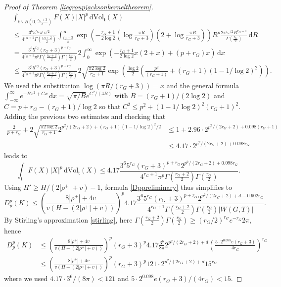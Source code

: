 \documentclass[11pt,a4paper]{article}
\theoremstyle{definition}
\begin{document}
\begin{proof}[Proof of Theorem \ref{liegroupjacksonkerneltheorem}]
\[ \begin{split} &\int_{\mathfrak{t} \backslash B \left( 0, \frac{r_G+3}{\pi} \right)} F(X) |X|^p \, \mathrm{d}\mathrm{Vol}_{\mathfrak{t}}(X) \\ &\le \frac{3^6 5^{r_G} \pi^{r_G /2}}{4^{r_G +1} \Gamma \left( \frac{r_G +2}{2} \right)} \int_{\frac{r_G+3}{\pi}}^{\infty} \exp \left( - \frac{r_G+1}{2 \log 2} \left( \log \frac{\pi R}{r_G+3} \right) \left( 2+\log \frac{\pi R}{r_G+3} \right) \right) R^p \frac{2 \pi^{r_G/2} R^{r_G-1}}{\Gamma \left( \frac{r_G}{2} \right)} \, \mathrm{d}R \\ &= \frac{3^6 5^{r_G} (r_G+3)^{p+r_G}}{4^{r_G+1} \pi^p \Gamma \left( \frac{r_G+2}{2} \right) \Gamma \left( \frac{r_G}{2} \right)} 2 \int_{0}^{\infty} \exp \left( - \frac{r_G+1}{2 \log 2} x (2+x) + (p+r_G) x \right) \, \mathrm{d}x \\ &\le \frac{3^6 5^{r_G} (r_G+3)^{p+r_G}}{4^{r_G+1} \pi^p \Gamma \left( \frac{r_G+2}{2} \right) \Gamma \left( \frac{r_G}{2} \right)} 2 \sqrt{\frac{\pi 2 \log 2}{r_G+1}} \exp \left( \frac{\log 2}{2} \left( \frac{p^2}{(r_G+1)} + (r_G+1) (1-1/\log 2)^2 \right) \right) . \end{split} \]
We used the substitution $\log (\pi R/(r_G+3))=x$ and the general formula $\int_{-\infty}^{\infty} e^{-Bx^2+Cx} \, \mathrm{d}x = \sqrt{\pi/B} e^{C^2/(4B)}$ with $B=(r_G+1)/(2 \log 2)$ and $C=p+r_G-(r_G+1)/\log 2$ so that $C^2 \le p^2+(1-1/\log 2)^2 (r_G+1)^2$. Adding the previous two estimates and checking that
\[ \begin{split} \frac{2}{p+r_G} + 2\sqrt{\frac{\pi 2 \log 2}{r_G+1}} 2^{p^2/(2r_G+2)+(r_G+1)(1-1/\log 2)^2 /2} &\le 1+ 2.96 \cdot 2^{p^2/(2r_G+2) + 0.098 (r_G+1)} \\ &\le 4.17 \cdot 2^{p^2/(2r_G+2)+0.098 r_G} \end{split} \]
leads to
\[ \int_{\mathfrak{t}} F(X) |X|^p \, \mathrm{d}\mathrm{Vol}_{\mathfrak{t}} (X) \le 4.17 \frac{3^6 5^{r_G} (r_G+3)^{p+r_G} 2^{p^2/(2r_G+2)+0.098 r_G}}{4^{r_G+1} \pi^p \Gamma \left( \frac{r_G+2}{2} \right) \Gamma \left( \frac{r_G}{2} \right)} . \]
Using $H' \ge H/(2|\rho^+|+v)-1$, formula \eqref{Dppreliminary} thus simplifies to
\[ D_p^p (K) \le \left( \frac{8 |\rho^+|+4v}{v(H-(2 |\rho^+|+v))} \right)^p 4.17 \frac{3^6 5^{r_G} (r_G+3)^{p+r_G} 2^{p^2/(2r_G+2)+d-0.902 r_G}}{4^{r_G+1}\Gamma \left( \frac{r_G+2}{2} \right) \Gamma \left( \frac{r_G}{2} \right) |W(G,T)|} . \]
By Stirling's approximation \eqref{stirling}, here $\Gamma (\frac{r_G+2}{2}) \Gamma (\frac{r_G}{2}) \ge (r_G/2)^{r_G} e^{-r_G} 2 \pi$, hence
\[ \begin{split} D_p^p (K) &\le \left( \frac{8 |\rho^+|+4v}{v(H-(2 |\rho^+|+v))} \right)^p (r_G+3)^p 4.17 \frac{3^6}{8 \pi} 2^{p^2/(2r_G+2)+d} \left( \frac{5\cdot 2^{0.098}e(r_G+3)}{4r_G} \right)^{r_G} \\ &\le \left( \frac{8 |\rho^+|+4v}{v(H-(2 |\rho^+|+v))} \right)^p (r_G+3)^p 121 \cdot 2^{p^2 / (2r_G+2)+d} 15^{r_G} \end{split} \]
where we used $4.17 \cdot 3^6 /(8 \pi) < 121$ and $5\cdot 2^{0.098}e(r_G+3)/(4r_G) < 15$.


\end{proof}
\end{document}
